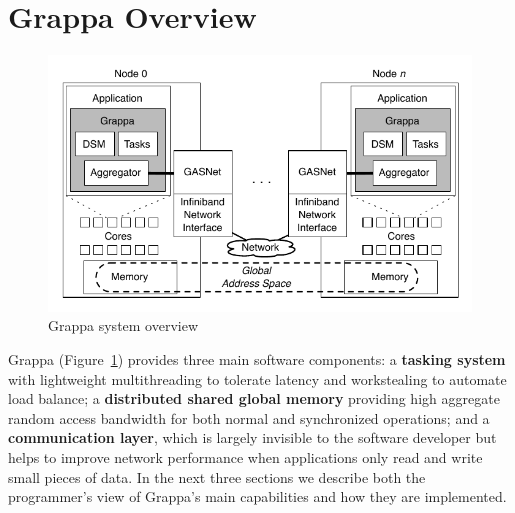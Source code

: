 \section{Grappa Overview}

\begin{figure}[t]
\begin{center}
  \includegraphics[width=0.95\columnwidth]{figs/system-overview}
\begin{minipage}{0.95\columnwidth}
  \caption{\label{fig:grappa} Grappa system overview}
\end{minipage}
\vspace{-3ex}
\end{center}
\end{figure}


Grappa (Figure~\ref{fig:grappa}) provides three main software components:
a \textbf{tasking system} with lightweight multithreading to tolerate
latency and workstealing to automate load balance;
a \textbf{distributed shared global memory} providing high aggregate
random access bandwidth for both normal and synchronized operations;
and a \textbf{communication layer}, which is largely invisible to the software developer but helps to improve network performance when applications only read and write small pieces of data.
In the next three sections we describe both the programmer's view of Grappa's main capabilities and how they are implemented.


